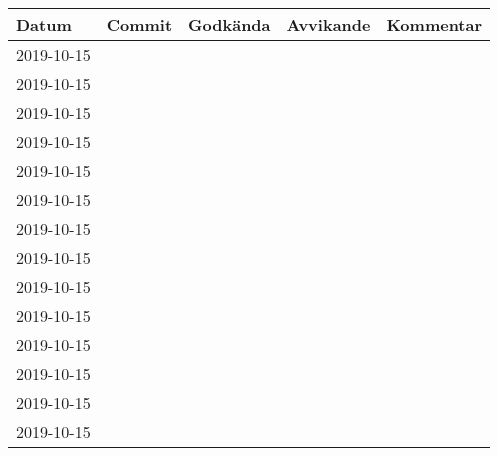 \documentclass{TDP003mall}
\begin{document}
\begin{tabular}{|l|l|l|l|l|}
  \hline
  Datum & Commit & Godkända & Avvikande & Kommentar \\ [0.5ex]
  \hline
  2019-10-15 &  &  &  & \\
  \hline
  \hline
  2019-10-15 &  &  &  & \\
  \hline
  \hline
  2019-10-15 &  &  &  & \\
  \hline
  \hline
  2019-10-15 &  &  &  & \\
  \hline
  \hline
  2019-10-15 &  &  &  & \\
  \hline
  \hline
  2019-10-15 &  &  &  & \\
  \hline
  \hline
  2019-10-15 &  &  &  & \\
  \hline
  \hline
  2019-10-15 &  &  &  & \\
  \hline
  \hline
  2019-10-15 &  &  &  & \\
  \hline
  \hline
  2019-10-15 &  &  &  & \\
  \hline
  \hline
  2019-10-15 &  &  &  & \\
  \hline
  \hline
  2019-10-15 &  &  &  & \\
  \hline
  \hline
  2019-10-15 &  &  &  & \\
  \hline
  \hline
  2019-10-15 &  &  &  & \\
  \hline
\end{tabular}





\end{document}
